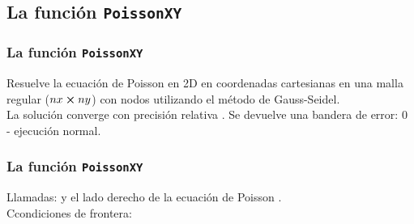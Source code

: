 \subsection*{La función \texttt{PoissonXY}}
\begin{frame}
\frametitle{La función \texttt{PoissonXY}}
Resuelve la ecuación de Poisson en 2D en coordenadas cartesianas en una malla regular ($nx \cp ny$) con nodos  utilizando el método de Gauss-Seidel.
\\
\bigskip
La solución  converge con precisión relativa . Se devuelve una bandera de error: $0$ - ejecución normal.
\end{frame}
\begin{frame}
\frametitle{La función \texttt{PoissonXY}}
Llamadas:  y el lado derecho de la ecuación de Poisson .
\\
\bigskip
Ccondiciones de frontera: \\
\\
\medskip
{}
\end{frame}
